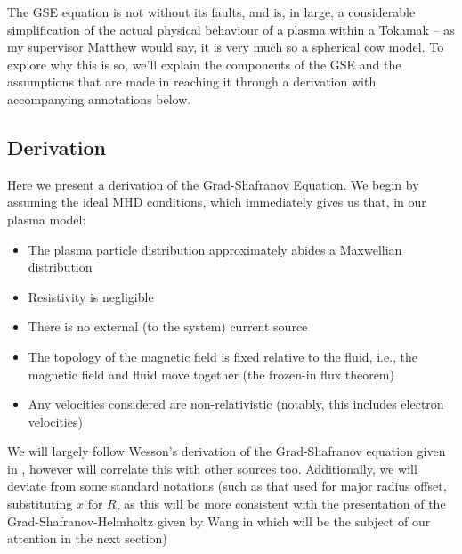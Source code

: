 The GSE equation is not without its faults, and is, in large, a considerable simplification of the actual physical behaviour 
of a plasma within a Tokamak -- as my supervisor Matthew would say, it is very much so a spherical cow model. To explore 
why this is so, we'll explain the components of the GSE and the assumptions that are made in reaching it through a 
derivation with accompanying annotations below.

\subsection{Derivation}

Here we present a derivation of the Grad-Shafranov Equation. We begin by assuming the ideal MHD conditions, which 
immediately gives us that, in our plasma model:
\begin{itemize}
    \item The plasma particle distribution approximately abides a Maxwellian distribution
    \item Resistivity is negligible
    \item There is no external (to the system) current source
    \item The topology of the magnetic field is fixed relative to the fluid, i.e., the magnetic field and fluid move together (the frozen-in flux theorem)
    \item Any velocities considered are non-relativistic (notably, this includes electron velocities)
\end{itemize}

\begin{remark}
    We will largely follow Wesson's derivation of the Grad-Shafranov equation given in \cite{wesson-tokamaks}, however 
    will correlate this with other sources too. Additionally, we will deviate from some standard notations (such as 
    that used for major radius offset, substituting $x$ for $R$, as this will be more consistent with the presentation 
    of the Grad-Shafranov-Helmholtz given by Wang in \cite{wang-analytic-solution} which will be the subject of our 
    attention in the next section)
\end{remark}

